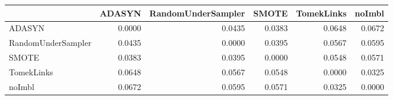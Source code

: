 \begin{tabular}{lrrrrr}
\toprule
 & ADASYN & RandomUnderSampler & SMOTE & TomekLinks & noImbl \\
\midrule
ADASYN & 0.0000 & 0.0435 & 0.0383 & 0.0648 & 0.0672 \\
RandomUnderSampler & 0.0435 & 0.0000 & 0.0395 & 0.0567 & 0.0595 \\
SMOTE & 0.0383 & 0.0395 & 0.0000 & 0.0548 & 0.0571 \\
TomekLinks & 0.0648 & 0.0567 & 0.0548 & 0.0000 & 0.0325 \\
noImbl & 0.0672 & 0.0595 & 0.0571 & 0.0325 & 0.0000 \\
\bottomrule
\end{tabular}
